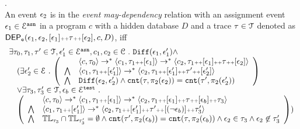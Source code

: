 \begin{defn}.
\label{def:event_dep}
\\ 
  An event $\mathtt{\epsilon}_2$ is in the \emph{event may-dependency} relation with an assignment
  event $\mathtt{\epsilon}_1 \in \mathcal{E}^{\mathtt{{asn}}}$ in a program ${c}$
  with a hidden database $D$ and a trace $\mathtt{\tau} \in \mathcal{T}$ denoted as 
  $\mathsf{DEP_{\mathtt{e}}}(\mathtt{\epsilon}_1, \mathtt{\epsilon}_2, [\mathtt{\epsilon}_1 ] {\scriptscriptstyle ++} \mathtt{\tau} {\scriptscriptstyle ++} [\mathtt{\epsilon}_2], c, D)$, iff
  \[
    \begin{array}{l}
  \exists \vtrace_0,
  \vtrace_1, \vtrace' \in \mathcal{T},\event_1' \in \eventset^{\asn}, {c}_1, {c}_2  \in \cdom  \st
  \diff(\event_1, \event_1') \land 
      \\ \quad
      (
        \exists  \event_2' \in \eventset \st 
    \left(
    \begin{array}{ll}   
   & \config{{c}, \vtrace_0} \rightarrow^{*} 
  \config{{c}_1, \vtrace_1 \tracecat [\event_1]}  \rightarrow^{*} 
    \config{{c}_2,  \vtrace_1 \tracecat [\event_1] \tracecat \vtrace \tracecat [\event_2] } 
   \\ 
   \bigwedge &
    \config{{c}_1, \vtrace_1 \tracecat [\event_1']}  \rightarrow^{*} 
    \config{{c}_2,  \vtrace_1 \tracecat[ \event_1'] \tracecat \vtrace' \tracecat [\event_2'] } 
  \\
  \bigwedge & 
  \diff(\event_2,\event_2' ) \land 
  \vcounter(\vtrace, \pi_2(\event_2))
  = 
  \vcounter(\vtrace', \pi_2(\event_2'))\\
  \end{array}
  \right)
  \\ \quad
  \lor 
  \exists \vtrace_3, \vtrace_3'  \in \mathcal{T}, \event_b \in \eventset^{\test} \st 
  \\ \quad
  \left(
  \begin{array}{ll}   
    & \config{{c}, \vtrace_0} \rightarrow^{*} 
      \config{{c}_1, \vtrace_1 \tracecat [\event_1]}  \rightarrow^{*} 
      \config{c_2,  \vtrace_1 \tracecat [\event_1] \tracecat \trace \tracecat [\event_b] \tracecat  \trace_3} 
    \\ 
    \bigwedge &
    \config{{c}_1, \vtrace_1 \tracecat [\event_1']}  \rightarrow^{*} 
    \config{c_2,  \vtrace_1 \tracecat [\event_1'] \tracecat \trace' \tracecat [(\neg \event_b)] \tracecat \trace_3'} 
    \\
    \bigwedge &  \tlabel_{\trace_3} \cap \tlabel_{\trace_3'} = \emptyset
     \land \vcounter(\trace', \pi_2(\event_b)) = \vcounter(\trace, \pi_2(\event_b)) 
    \land \event_2 \in \trace_3
    \land \event_2 \not\in \trace_3'
  \end{array}
  \right)
  )
\end{array}
   \]
%
\end{defn}
